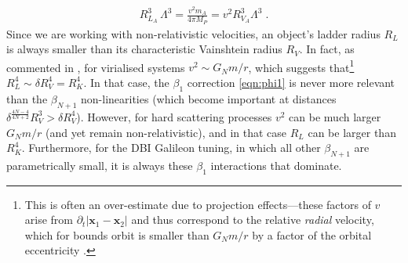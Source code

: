 \documentclass[11pt]{article}
\begin{document}
\begin{align}
 R_{L_A}^3  \, \Lambda^3  = \frac{ v^2 m_A}{4 \pi M_P} = v^2 R_{V_A}^3  \Lambda^3 \; .
\end{align}
Since we are working with non-relativistic velocities, an object's ladder radius $R_L$ is always smaller than its characteristic Vainshtein radius $R_V$. 
In fact, as commented in \cite{Kuntz:2019zef}, for virialised systems $v^2 \sim G_N m/r$, which suggests that\footnote{
This is often an over-estimate due to projection effects---these factors of $v$ arise from $\partial_t | \mathbf{x}_{1} - \mathbf{x}_2 |$ and thus correspond to the relative \emph{radial} velocity, which for bounds orbit is smaller than $G_N m /r$ by a factor of the orbital eccentricity \cite{Davis:2019ltc}.  
} $R_L^4 \sim \delta R_V^4= R_K^4$. In that case, the $\beta_1$ correction \eqref{eqn:phi1} is never more relevant than the $\beta_{N+1}$ non-linearities (which become important at distances $\delta^{\frac{4N-4}{4N+2}} R_V^3 > \delta R_V^4$). 
However, for hard scattering processes $v^2$ can be much larger $G_N m/r$ (and yet remain non-relativistic), and in that case $R_L$ can be larger than $R_K^4$. Furthermore, for the DBI Galileon tuning, in which all other $\beta_{N+1}$ are parametrically small, it is always these $\beta_1$ interactions that dominate. 


\end{document}
